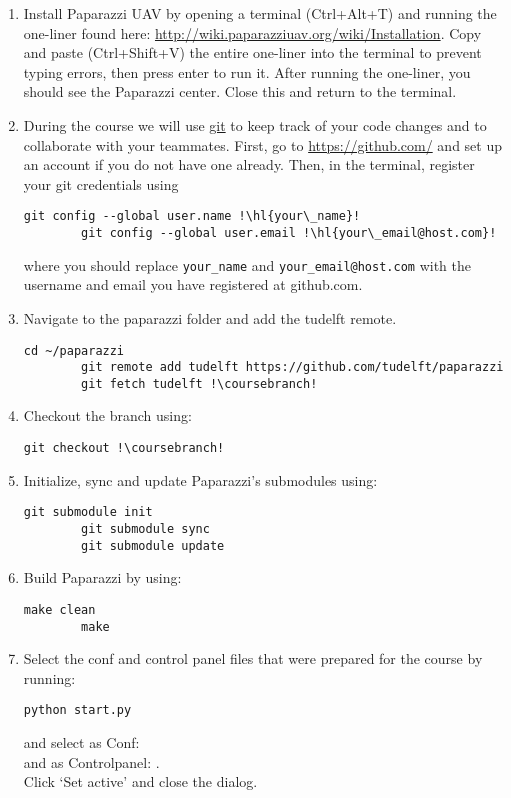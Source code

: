 \begin{enumerate}
	\item{Install Paparazzi UAV by opening a terminal (Ctrl+Alt+T) and running the one-liner found here: \url{http://wiki.paparazziuav.org/wiki/Installation}. Copy and paste (Ctrl+Shift+V) the entire one-liner into the terminal to prevent typing errors, then press enter to run it. After running the one-liner, you should see the Paparazzi center. Close this and return to the terminal.}
	
	\item{During the course we will use \href{https://git-scm.com/}{git} to keep track of your code changes and to collaborate with your teammates. First, go to \url{https://github.com/} and set up an account if you do not have one already. Then, in the terminal, register your git credentials using
	\begin{lstlisting}[style=Bash]
		git config --global user.name !\hl{your\_name}!
		git config --global user.email !\hl{your\_email@host.com}!
	\end{lstlisting}
	where you should replace \texttt{your\_name} and \texttt{your\_email@host.com} with the username and email you have registered at github.com.}
	
	\item Navigate to the paparazzi folder and add the tudelft remote.
	\begin{lstlisting}[style=Bash]
		cd ~/paparazzi
		git remote add tudelft https://github.com/tudelft/paparazzi
		git fetch tudelft !\coursebranch!
	\end{lstlisting}
	
	\item Checkout the \coursebranch{} branch using:
	\begin{lstlisting}[style=Bash]
		git checkout !\coursebranch!
	\end{lstlisting}
	
	\item Initialize, sync and update Paparazzi's submodules using:
	\begin{lstlisting}[style=Bash]
		git submodule init
		git submodule sync
		git submodule update
	\end{lstlisting}
	
	\item Build Paparazzi by using:
	\begin{lstlisting}[style=Bash]
		make clean
		make
	\end{lstlisting}
	
	\item{Select the conf and control panel files that were prepared for the course by running:
	\begin{lstlisting}[style=Bash]
		python start.py
	\end{lstlisting}
	and select as Conf: \\
	and as Controlpanel: .\\
	Click `Set active' and close the dialog.}
	

\end{enumerate}
